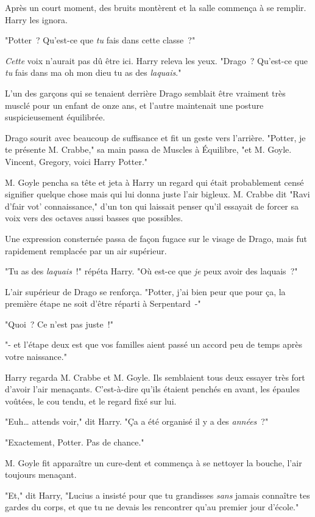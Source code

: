 Après un court moment, des bruits montèrent et la salle commença à se remplir. Harry les ignora.

"Potter~? Qu'est-ce que \emph{tu} fais dans cette classe~?"

\emph{Cette} voix n'aurait pas dû être ici. Harry releva les yeux. "Drago~? Qu'est-ce que \emph{tu} fais dans ma oh mon dieu tu as des \emph{laquais}."

L'un des garçons qui se tenaient derrière Drago semblait être vraiment très musclé pour un enfant de onze ans, et l'autre maintenait une posture suspicieusement équilibrée.

Drago sourit avec beaucoup de suffisance et fit un geste vers l'arrière. "Potter, je te présente M. Crabbe," sa main passa de Muscles à Équilibre, "et M. Goyle. Vincent, Gregory, voici Harry Potter."

M. Goyle pencha sa tête et jeta à Harry un regard qui était probablement censé signifier quelque chose mais qui lui donna juste l'air bigleux. M. Crabbe dit "Ravi d'fair vot' connaissance," d'un ton qui laissait penser qu'il essayait de forcer sa voix vers des octaves aussi basses que possibles.

Une expression consternée passa de façon fugace sur le visage de Drago, mais fut rapidement remplacée par un air supérieur.

"Tu as des \emph{laquais}~!" répéta Harry. "Où est-ce que \emph{je} peux avoir des laquais~?"

L'air supérieur de Drago se renforça. "Potter, j'ai bien peur que pour ça, la première étape ne soit d'être réparti à Serpentard~-"

"Quoi~? Ce n'est pas juste~!"

"- et l'étape deux est que vos familles aient passé un accord peu de temps après votre naissance."

Harry regarda M. Crabbe et M. Goyle. Ils semblaient tous deux essayer très fort d'avoir l'air menaçants. C'est-à-dire qu'ils étaient penchés en avant, les épaules voûtées, le cou tendu, et le regard fixé sur lui.

"Euh… attends voir," dit Harry. "Ça a été organisé il y a des \emph{années}~?"

"Exactement, Potter. Pas de chance."

M. Goyle fit apparaître un cure-dent et commença à se nettoyer la bouche, l'air toujours menaçant.

"Et," dit Harry, "Lucius a insisté pour que tu grandisses \emph{sans} jamais connaître tes gardes du corps, et que tu ne devais les rencontrer qu'au premier jour d'école."

